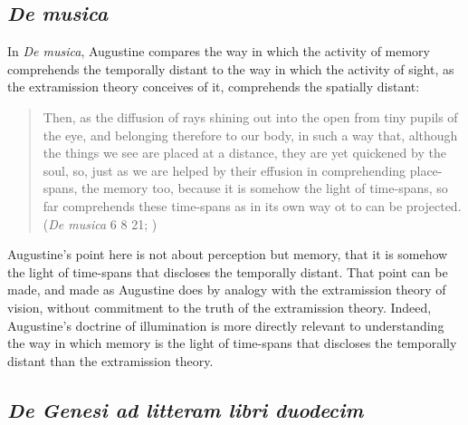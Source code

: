 \documentclass[12pt]{article}
\begin{document}
\subsection{\emph{De musica}} %
\label{sub:de_musica}

In \emph{De musica}, Augustine compares the way in which the activity of memory comprehends the temporally distant to the way in which the activity of sight, as the extramission theory conceives of it, comprehends the spatially distant:
\begin{quote}
	Then, as the diffusion of rays shining out into the open from tiny pupils of the eye, and belonging therefore to our body, in such a way that, although the things we see are placed at a distance, they are yet quickened by the soul, so, just as we are helped by their effusion in comprehending place-spans, the memory too, because it is somehow the light of time-spans, so far comprehends these time-spans as in its own way ot to can be projected. (\emph{De musica} 6 8 21; \citealt[346]{Taliaferro:1947aa})
\end{quote}
Augustine's point here is not about perception but memory, that it is somehow the light of time-spans that discloses the temporally distant. That point can be made, and made as Augustine does by analogy with the extramission theory of vision, without commitment to the truth of the extramission theory. Indeed, Augustine's doctrine of illumination is more directly relevant to understanding the way in which memory is the light of time-spans that discloses the temporally distant than the extramission theory.


\subsection{\emph{De Genesi ad litteram libri duodecim}} %
\label{sub:de_genesi_ad_litteram_libri_duodecim}
\end{document}
